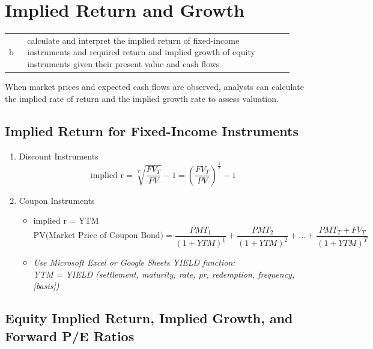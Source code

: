 \section{Implied Return and Growth}
\label{sec:Implied Return and Growth}
\begin{center}
\begin{tabular}{p{0.06\linewidth} | p{0.88\linewidth}}
	b & calculate and interpret the implied return of fixed-income instruments and required return and implied growth of equity instruments given their present value and cash flows \\
\end{tabular}
\end{center}

When market prices and expected cash flows are observed, analysts can calculate the implied rate of return and the implied growth rate to assess valuation.

\subsection{Implied Return for Fixed-Income Instruments}
	\label{subsec:Implied Return for Fixed-Income Instruments}
\begin{enumerate}
	\item Discount Instruments
	      \begin{equation*}
		      \text{implied r} = \sqrt[T]{\frac{FV_T}{PV}} - 1 = \left(\frac{FV_T}{PV}\right)^\frac{1}{T} - 1
	      \end{equation*}
	\item Coupon Instruments
	      \begin{itemize}
		      \item[] implied r = YTM
		            \begin{equation*}
			            \text{PV(Market Price of Coupon Bond)} = \frac{PMT_1}{(1+YTM)^1}+\frac{PMT_2}{(1+YTM)^2}+...+\frac{PMT_T + FV_T}{(1+YTM)^T}
		            \end{equation*}
		      \item[] \textit{Use Microsoft Excel or Google Sheets YIELD function:\\
			            YTM = YIELD (settlement, maturity, rate, pr, redemption, frequency, [basis])
		            }
	      \end{itemize}
\end{enumerate}

\subsection{Equity Implied Return, Implied Growth, and Forward P/E Ratios}
	\label{subsec:Equity Implied Return, Implied Growth, and Forward P/E Ratios}

